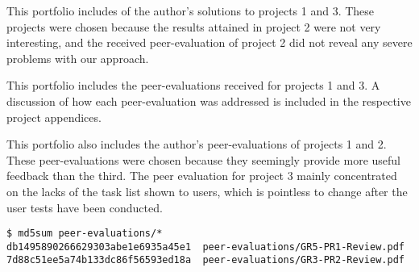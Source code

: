 
This portfolio includes of the author's solutions to projects 1 and 3. These
projects were chosen because the results attained in project 2 were not very
interesting, and the received peer-evaluation of project 2 did not reveal any
severe problems with our approach.

This portfolio includes the peer-evaluations received for projects 1 and 3. A
discussion of how each peer-evaluation was addressed is included in the
respective project appendices.

This portfolio also includes the author's peer-evaluations of projects 1 and 2.
These peer-evaluations were chosen because they seemingly provide more useful
feedback than the third. The peer evaluation for project 3 mainly concentrated
on the lacks of the task list shown to users, which is pointless to change
after the user tests have been conducted.

\begin{lstlisting}
$ md5sum peer-evaluations/*
db1495890266629303abe1e6935a45e1  peer-evaluations/GR5-PR1-Review.pdf
7d88c51ee5a74b133dc86f56593ed18a  peer-evaluations/GR3-PR2-Review.pdf
\end{lstlisting}

